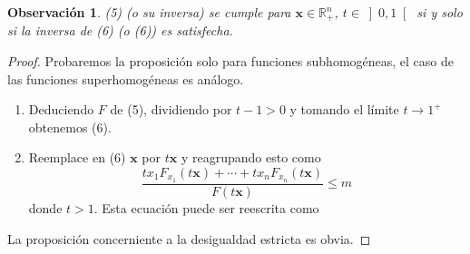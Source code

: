 \documentclass[a4paper,fleqn]{cas-dc}
\begin{document}
\newtheorem{remark}{Observación}
\begin{remark}
(5) (o su inversa) se cumple para $\bm{x}\in\mathds{R}^{n}_{+}$, $t\in\left]0,1\right[$ si y solo si la inversa de (6) (o (6)) es satisfecha.
\end{remark}
\begin{proof}
Probaremos la proposición solo para funciones subhomogéneas, el caso de las funciones superhomogéneas es análogo.
\begin{enumerate}
	\item[Necesidad] Deduciendo $F$ de (5), dividiendo por $t-1>0$ y tomando el límite $t\to1^{+}$ obtenemos (6).
	\item[Suficiencia] Reemplace en (6) $\bm{x}$ por $t\bm{x}$ y reagrupando esto como \[ \frac{tx_{1}F_{x_{1}}\left(t\bm{x}\right)+\cdots+tx_{n}F_{x_{n}}\left(t\bm{x}\right)}{F\left(t\bm{x}\right)}\leq m \] donde $t>1$. Esta ecuación puede ser reescrita como %
\end{enumerate}
La proposición concerniente a la desigualdad estricta es obvia.
\end{proof}
\end{document}
